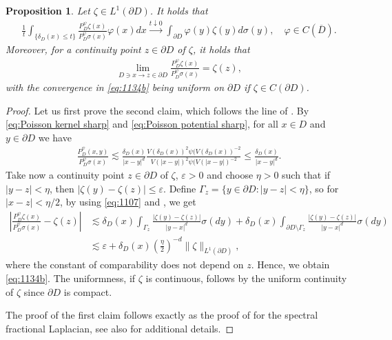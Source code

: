 \documentclass[12pt,a4paper,onecolumn]{article}
\newtheorem{prop}[thm]{Proposition}
\theoremstyle{definition}
\newcommand{\1}{\mathbf 1}
\newcommand{\de}{\delta_D}
\newcommand{\PDS}{P^{\psi}_{ D}}
\numberwithin{equation}{section}
\begin{document}
	\begin{prop}\label{p:bnd-bhv-PDSzeta}
		Let $\zeta\in L^1(\partial D)$. It holds that 
		\begin{align*}
			\frac1t\int_{\{\de(x)\le t\}}
			\frac{\PDS\zeta(x)}{\PDS\sigma(x)}\varphi(x)dx
			\xrightarrow{t\downarrow 0} \int_{\partial D}\varphi(y)\zeta(y)d\sigma(y),\quad \varphi\in C(\overline D).
		\end{align*}
		Moreover, for a continuity point $z\in \partial D$ of $\zeta$, it holds that
		\begin{align}\label{eq:1134b}
			\lim_{D\ni x\to z\in\partial D}\frac{\PDS\zeta(x)}{\PDS\sigma(x)}=\zeta(z),
		\end{align}
		with the convergence in \eqref{eq:1134b} being uniform on $\partial D$ if $\zeta\in C(\partial D)$.
	\end{prop}
	\begin{proof}
		Let us first prove the second claim, which follows the line of \cite[Proposition 3.4]{Bio23cpaa}.  By \eqref{eq:Poisson kernel sharp} and \eqref{eq:Poisson potential sharp}, for all $x\in D$ and $y\in \partial D$ we have
		\begin{align}\label{eq:1107}
			\frac{\PDS(x,y)}{\PDS\sigma(x)}\lesssim
			\frac{\de(x)}{|x-y|^{d}}
			\frac{V(\de(x))^2 \psi(V(\de(x))^{-2}}{V(|x- y |)^2 \psi(V(|x-y |)^{-2}}\le
			\frac{\de(x)}{|x-y|^{d}}.
		\end{align}
		Take now a continuity point $z\in \partial D$ of $\zeta$, $\varepsilon>0$ and choose $\eta>0$ such that if $|y-z|<\eta$, then $|\zeta(y)-\zeta(z)|\le \varepsilon$. Define $\Gamma_z=\{y\in \partial D:|y-z|<\eta\}$, so for $|x-z|<\eta/2$, by using \eqref{eq:1107} and \cite[Lemma A.2]{Bio23cpaa}, we get
		\begin{align*}
			\left|\frac{\PDS\zeta(x)}{\PDS\sigma(x)}-\zeta(z)\right|&\lesssim \de(x)\int_{\Gamma_z}\frac{|\zeta(y)-\zeta(z)|}{|y- x|^d}\sigma(dy)+\de(x)\int_{\partial D\setminus \Gamma_z}\frac{|\zeta(y)-\zeta(z)|}{|y- x|^d}\sigma(dy)\\
			&\lesssim \varepsilon + \de(x)\left(\frac{\eta}{2}\right)^{-d}\|\zeta\|_{L^1(\partial D)},
		\end{align*}
		where the constant of comparability does not depend on $z$. Hence, we obtain \eqref{eq:1134b}. The uniformness, if $\zeta$ is continuous, follows by the uniform continuity of $\zeta$ since $\partial D$ is compact.
		
		The proof of the first claim follows exactly as the proof of \cite[Theorem 26]{AbaDup-Nonhomog2017} for the spectral fractional Laplacian, see also \cite[Proposition 3.5]{Bio23cpaa} for additional details.
	\end{proof}
	
\end{document}
